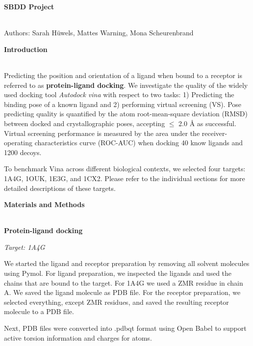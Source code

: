 \documentclass[a4paper,10pt]{article}
\begin{document}


\begin{huge}
	\vspace{1cm}
	\textbf{SBDD Project}
\end{huge} \\

Authors: Sarah Hüwels, Mattes Warning, Mona Scheurenbrand 

\begin{large}
	\vspace{0.5cm}
	\textbf{Introduction}
\end{large}	\\ [1mm]

Predicting the position and orientation of a ligand when bound to a receptor is referred to as \textbf{protein-ligand docking}.
We investigate the quality of the widely used docking tool \textit{Autodock vina} \cite{eberhardt2021autodock} with respect to two tasks: 1) Predicting the binding pose of a known ligand and
2) performing virtual screening (VS). Pose predicting quality is quantified by the atom root-mean-square deviation (RMSD) between docked and crystallographic poses, accepting $\leq$ 2.0 Å as successful.
Virtual screening performance is measured by the area under the receiver-operating characteristics curve (ROC-AUC) when docking 40 know ligands and 1200 decoys.

To benchmark Vina across different biological contexts, we selected four targets: 1A4G, 1OUK, 1E3G, and 1CX2. Please refer to the individual sections for more detailed descriptions of these targets.

\begin{large}
	\vspace{0.5cm}
	\textbf{Materials and Methods}
\end{large}	\\ [1mm]

\textbf{Protein-ligand docking}

\textit{Target: 1A4G}

We started the ligand and receptor preparation by removing all solvent molecules using Pymol. 
For ligand preparation, we inspected the ligands and used the chains that are bound to the target. For 1A4G we used a ZMR residue in chain A. We saved the ligand molecule as PDB file.
For the receptor preparation, we selected everything, except ZMR residues, and saved the resulting receptor molecule to a PDB file.

Next, PDB files were converted into .pdbqt format using Open Babel to support active torsion information and charges for atoms. 
\end{document}

